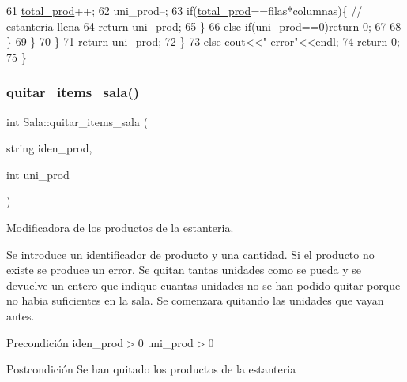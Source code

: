 \begin{DoxyCode}
61                     \hyperlink{class_sala_aeb64df257f47ad63fe1ba3b163255e14}{total\_prod}++;
62                     uni\_prod--;
63                     \textcolor{keywordflow}{if}(\hyperlink{class_sala_aeb64df257f47ad63fe1ba3b163255e14}{total\_prod}==filas*columnas)\{  \textcolor{comment}{// estanteria llena}
64                         \textcolor{keywordflow}{return} uni\_prod;
65                     \}
66                     \textcolor{keywordflow}{else} \textcolor{keywordflow}{if}(uni\_prod==0)\textcolor{keywordflow}{return} 0; 
67                     
68                 \}
69             \}
70         \}
71         \textcolor{keywordflow}{return} uni\_prod;
72     \}
73     \textcolor{keywordflow}{else} cout<<\textcolor{stringliteral}{"  error"}<<endl;
74     \textcolor{keywordflow}{return} 0;
75 \}
\end{DoxyCode}
\mbox{\label{class_sala_af099ecd547afeb3a34fc75639372f330}} 
\subsubsection{\texorpdfstring{quitar\+\_\+items\+\_\+sala()}{quitar\_items\_sala()}}
{\footnotesize\ttfamily int Sala\+::quitar\+\_\+items\+\_\+sala (\begin{DoxyParamCaption}\item[{string}]{iden\+\_\+prod,  }\item[{int}]{uni\+\_\+prod }\end{DoxyParamCaption})}



Modificadora de los productos de la estanteria. 

Se introduce un identificador de producto y una cantidad. Si el producto no existe se produce un error. Se quitan tantas unidades como se pueda y se devuelve un entero que indique cuantas unidades no se han podido quitar porque no habia suficientes en la sala. Se comenzara quitando las unidades que vayan antes. \begin{DoxyPrecond}{Precondición}
iden\+\_\+prod$>$0 uni\+\_\+prod$>$0 
\end{DoxyPrecond}
\begin{DoxyPostcond}{Postcondición}
Se han quitado los productos de la estanteria 
\end{DoxyPostcond}


